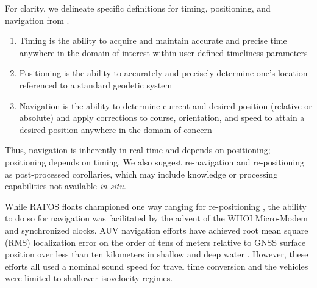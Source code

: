 
For clarity, we delineate specific definitions for timing, positioning, and navigation from \citet{howe2019observing}.
\begin{enumerate}
	\item Timing is the ability to acquire and maintain accurate and precise time anywhere in the domain of interest within user-defined timeliness parameters
	\item Positioning is the ability to accurately and precisely determine one's location referenced to a standard geodetic system
	\item Navigation is the ability to determine current and desired position (relative or absolute) and apply corrections to course, orientation, and speed to attain a desired position anywhere in the domain of concern
\end{enumerate}
Thus, navigation is inherently in real time and depends on positioning; positioning depends on timing.
We also suggest re-navigation and re-positioning as post-processed corollaries, which may include knowledge or processing capabilities not available \textit{in situ}.

While RAFOS floats championed one way ranging for re-positioning \citep{Rossby1986,Duda2006}, the ability to do so for navigation was facilitated by  the advent of the WHOI Micro-Modem \citep{Singh2006} and synchronized clocks.
AUV navigation efforts have achieved root mean square (RMS) localization error on the order of tens of meters relative to GNSS surface position over less than ten kilometers in shallow \citep{Eustice2007,Kepper2017,Claus2018} and deep water \citep{Kunz2008,Jakuba2008,Webster2009}.
However, these efforts all used a nominal sound speed for travel time conversion and the vehicles were limited to shallower isovelocity regimes.

